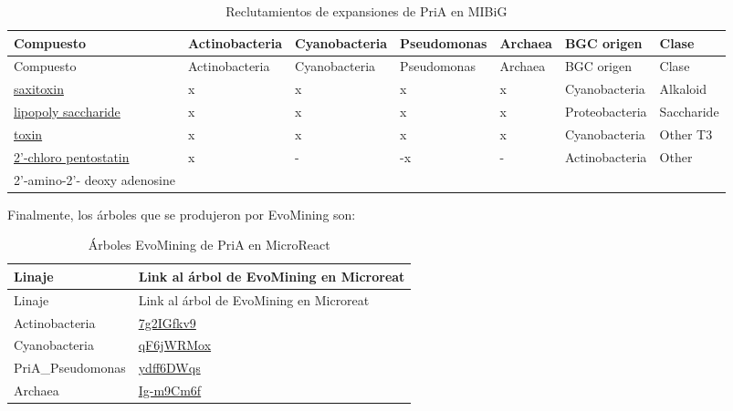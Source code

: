 \documentclass[12pt,twoside]{reedthesis}
\begin{document}
  \begin{longtable}[]{@{}lllllll@{}}
  \caption{Reclutamientos de expansiones de PriA en MIBiG
  \label{tab:reclutamientos}}\tabularnewline
  \toprule
  Compuesto & Actinobacteria & Cyanobacteria & Pseudomonas & Archaea & BGC
  origen & Clase\tabularnewline
  \midrule
  \endfirsthead
  \toprule
  Compuesto & Actinobacteria & Cyanobacteria & Pseudomonas & Archaea & BGC
  origen & Clase\tabularnewline
  \midrule
  \endhead
  \href{http://mibig.secondarymetabolites.org/repository/BGC0000188/index.html\#cluster-1}{saxitoxin}
  & x & x & x & x & Cyanobacteria & Alkaloid\tabularnewline
  \href{http://mibig.secondarymetabolites.org/repository/BGC0000775/index.html\#cluster-1}{lipopoly
  saccharide} & x & x & x & x & Proteobacteria & Saccharide\tabularnewline
  \href{http://mibig.secondarymetabolites.org/repository/BGC0000928/index.html\#cluster-1}{toxin}
  & x & x & x & x & Cyanobacteria & Other T3\tabularnewline
  \href{http://mibig.secondarymetabolites.org/repository/BGC0001484/index.html\#cluster-1}{2'-chloro
  pentostatin} & x & - & -x & - & Actinobacteria & Other\tabularnewline
  2'-amino-2'- deoxy adenosine & & & & & &\tabularnewline
  \bottomrule
  \end{longtable}
  
  Finalmente, los árboles que se produjeron por EvoMining son:
  
  \begin{longtable}[]{@{}ll@{}}
  \caption{Árboles EvoMining de PriA en MicroReact
  \label{tab:arboles}}\tabularnewline
  \toprule
  Linaje & Link al árbol de EvoMining en Microreat\tabularnewline
  \midrule
  \endfirsthead
  \toprule
  Linaje & Link al árbol de EvoMining en Microreat\tabularnewline
  \midrule
  \endhead
  Actinobacteria &
  \href{https://microreact.org/project/7g2IGfkv9}{7g2IGfkv9}\tabularnewline
  Cyanobacteria &
  \href{https://microreact.org/project/qF6jWRMox}{qF6jWRMox}\tabularnewline
  PriA\_Pseudomonas &
  \href{https://microreact.org/project/ydff6DWqs}{ydff6DWqs}\tabularnewline
  Archaea &
  \href{https://microreact.org/project/Ig-m9Cm6f}{Ig-m9Cm6f}\tabularnewline
  \bottomrule
  \end{longtable}
  
\end{document}

